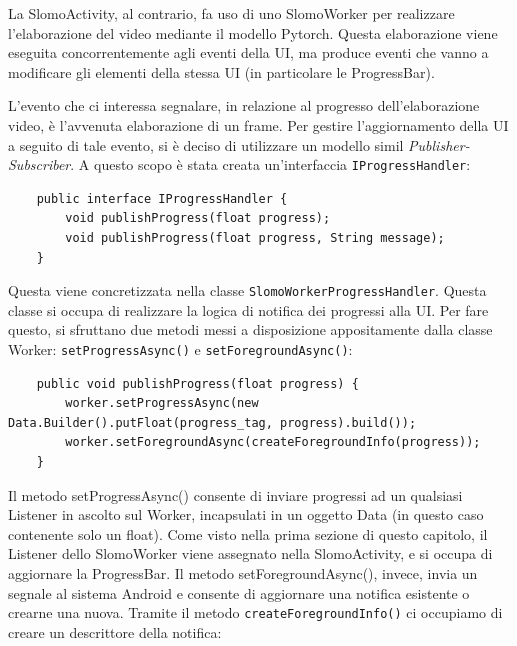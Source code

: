La SlomoActivity, al contrario, fa uso di uno SlomoWorker per realizzare l'elaborazione del video mediante il modello Pytorch.
Questa elaborazione viene eseguita concorrentemente agli eventi della UI, ma produce eventi che vanno a modificare gli elementi
della stessa UI (in particolare le ProgressBar).

L'evento che ci interessa segnalare, in relazione al progresso dell'elaborazione video, è l'avvenuta elaborazione di un 
frame. Per gestire l'aggiornamento della UI a seguito di tale evento, si è deciso di utilizzare un modello
simil \textit{Publisher-Subscriber}. A questo scopo è stata creata un'interfaccia \texttt{IProgressHandler}:

\begin{lstlisting}
    public interface IProgressHandler {
        void publishProgress(float progress);
        void publishProgress(float progress, String message);
    }    
\end{lstlisting}

Questa viene concretizzata nella classe \texttt{SlomoWorkerProgressHandler}. Questa classe si occupa di realizzare la logica
di notifica dei progressi alla UI. Per fare questo, si sfruttano due metodi messi a disposizione appositamente dalla classe
Worker: \texttt{setProgressAsync()} e \texttt{setForegroundAsync()}:

\begin{lstlisting}
    public void publishProgress(float progress) {
        worker.setProgressAsync(new Data.Builder().putFloat(progress_tag, progress).build());
        worker.setForegroundAsync(createForegroundInfo(progress));
    }
\end{lstlisting}

Il metodo setProgressAsync() consente di inviare progressi ad un qualsiasi Listener in ascolto sul Worker, incapsulati in
un oggetto Data (in questo caso contenente solo un float). Come visto nella prima sezione di questo capitolo, il Listener
dello SlomoWorker viene assegnato nella SlomoActivity, e si occupa di aggiornare la ProgressBar.
Il metodo setForegroundAsync(), invece, invia un segnale al sistema Android e consente di aggiornare una notifica esistente
o crearne una nuova. Tramite il metodo \texttt{createForegroundInfo()} ci occupiamo di creare un descrittore della notifica:

